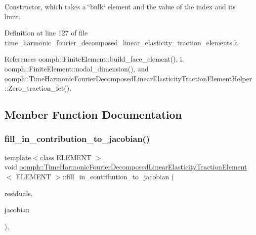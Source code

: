Constructor, which takes a \char`\"{}bulk\char`\"{} element and the value of the index and its limit. 



Definition at line 127 of file time\+\_\+harmonic\+\_\+fourier\+\_\+decomposed\+\_\+linear\+\_\+elasticity\+\_\+traction\+\_\+elements.\+h.



References oomph\+::\+Finite\+Element\+::build\+\_\+face\+\_\+element(), i, oomph\+::\+Finite\+Element\+::nodal\+\_\+dimension(), and oomph\+::\+Time\+Harmonic\+Fourier\+Decomposed\+Linear\+Elasticity\+Traction\+Element\+Helper\+::\+Zero\+\_\+traction\+\_\+fct().



\subsection{Member Function Documentation}
\mbox{\label{classoomph_1_1TimeHarmonicFourierDecomposedLinearElasticityTractionElement_a4f179e4db7ec168346089fb1b75fbdc8}} 
\subsubsection{\texorpdfstring{fill\+\_\+in\+\_\+contribution\+\_\+to\+\_\+jacobian()}{fill\_in\_contribution\_to\_jacobian()}}
{\footnotesize\ttfamily template$<$class E\+L\+E\+M\+E\+NT $>$ \\
void \hyperlink{classoomph_1_1TimeHarmonicFourierDecomposedLinearElasticityTractionElement}{oomph\+::\+Time\+Harmonic\+Fourier\+Decomposed\+Linear\+Elasticity\+Traction\+Element}$<$ E\+L\+E\+M\+E\+NT $>$\+::fill\+\_\+in\+\_\+contribution\+\_\+to\+\_\+jacobian (\begin{DoxyParamCaption}\item[{\hyperlink{classoomph_1_1Vector}{Vector}$<$ double $>$ \&}]{residuals,  }\item[{\hyperlink{classoomph_1_1DenseMatrix}{Dense\+Matrix}$<$ double $>$ \&}]{jacobian }\end{DoxyParamCaption})\hspace{0.3cm}{\ttfamily [inline]}, {\ttfamily [virtual]}}



